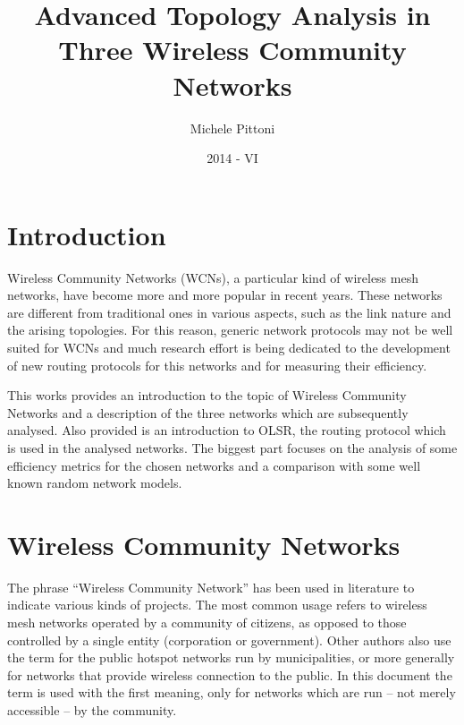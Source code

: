 \documentclass[oneside,openany]{memoir}
\title{Advanced Topology Analysis in Three Wireless Community Networks}
\author{Michele Pittoni}
\date{2014 - VI}
\begin{document}
\maketitle

\newcommand{\st}{\text{ st. }}
\newcommand{\etx}{\mathrm{ETX}}
\newcommand{\linkq}{\mathrm{LQ}}
\newcommand{\nlq}{\mathrm{NLQ}}
\newcommand{\mpr}{\mathrm{MPR}}


\chapter*{Introduction}\label{introduction}

Wireless Community Networks (WCNs), a particular kind of wireless mesh
networks, have become more and more popular in recent years. These
networks are different from traditional ones in various aspects, such as
the link nature and the arising topologies. For this reason, generic
network protocols may not be well suited for WCNs and much research
effort is being dedicated to the development of new routing protocols
for this networks and for measuring their efficiency.

This works provides an introduction to the topic of Wireless Community
Networks and a description of the three networks which are subsequently
analysed. Also provided is an introduction to OLSR, the routing protocol
which is used in the analysed networks. The biggest part focuses on the
analysis of some efficiency metrics for the chosen networks and a
comparison with some well known random network models.

\chapter{Wireless Community Networks}\label{wireless-community-networks}

The phrase ``Wireless Community Network'' has been used in literature to
indicate various kinds of projects. The most common usage refers to
wireless mesh networks operated by a community of citizens, as opposed
to those controlled by a single entity (corporation or government).
Other authors also use the term for the public hotspot networks run by
municipalities, or more generally for networks that provide wireless
connection to the public. In this document the term is used with the
first meaning, only for networks which are run -- not merely accessible
-- by the community.
\end{document}
